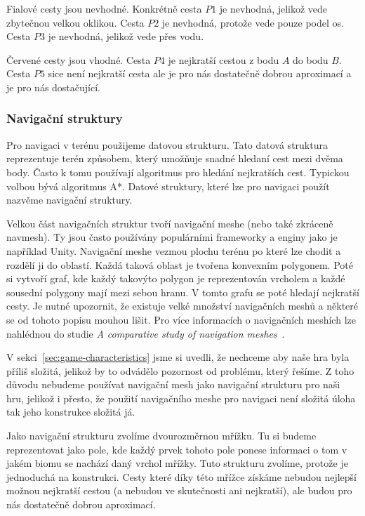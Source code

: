 Fialové cesty jsou nevhodné. Konkrétně cesta $P1$ je nevhodná, jelikož vede zbytečnou velkou oklikou. Cesta $P2$ je nevhodná, protože vede pouze podel os. Cesta $P3$ je nevhodná, jelikož vede přes vodu.

Červené cesty jsou vhodné. Cesta $P4$ je nejkratší cestou z bodu $A$ do bodu $B$. Cesta $P5$ sice není nejkratší cesta ale je pro nás dostatečně dobrou aproximací a je pro nás dostačující.

\subsubsection{Navigační struktury}
Pro navigaci v terénu použijeme datovou strukturu. Tato datová struktura reprezentuje terén způsobem, který umožňuje snadné hledaní cest mezi dvěma body. Často k tomu používají algoritmus pro hledání nejkratších cest. Typickou volbou bývá algoritmus A*. Datové struktury, které lze pro navigaci použít nazvěme navigační struktury.

Velkou část navigačních struktur tvoří navigační meshe (nebo také zkráceně navmesh). Ty jsou často používány populárními frameworky a enginy jako je například Unity. Navigační meshe vezmou plochu terénu po které lze chodit a rozdělí ji do oblastí. Každá taková oblast je tvořena konvexním polygonem. Poté si vytvoří graf, kde každý takovýto polygon je reprezentován vrcholem a každé sousední polygony mají mezi sebou hranu. V tomto grafu se poté hledají nejkratší cesty. Je nutné upozornit, že existuje velké množství navigačních meshů a některé se od tohoto popisu mouhou lišit. Pro více informacích o navigačních meshích lze nahlédnou do studie \textit{A comparative study of navigation meshes}~\cite{10.1145/2994258.2994262}.

V sekci~\ref{sec:game-characteristics} jsme si uvedli, že nechceme aby naše hra byla příliš složitá, jelikož by to odvádělo pozornost od problému, který řešíme. Z toho důvodu nebudeme používat navigační mesh jako navigační strukturu pro naši hru, jelikož i přesto, že použití navigačního meshe pro navigaci není složitá úloha tak jeho konstrukce složitá já.

Jako navigační strukturu zvolíme dvourozměrnou mřížku. Tu si budeme reprezentovat jako pole, kde každý prvek tohoto pole ponese informaci o tom v jakém biomu se nachází daný vrchol mřížky. Tuto strukturu zvolíme, protože je jednoduchá na konstrukci. Cesty které díky této mřížce získáme nebudou nejlepší možnou nejkratší cestou (a nebudou ve skutečnosti ani nejkratší), ale budou pro nás dostatečně dobrou aproximací. 

